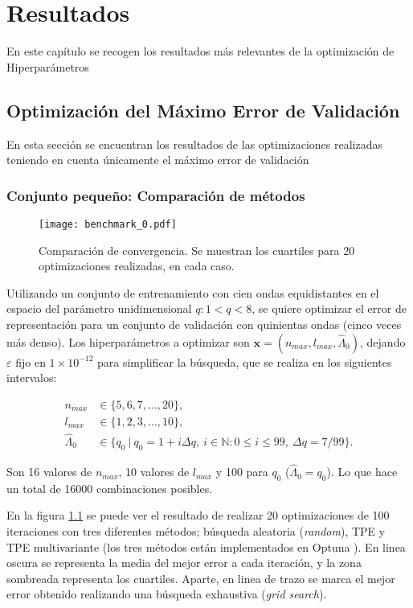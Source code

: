 \chapter{Resultados}

En este capítulo se recogen los resultados más relevantes de la optimización de Hiperparámetros
\section{Optimización del Máximo Error de Validación}
En esta sección se encuentran los resultados de las optimizaciones realizadas teniendo en cuenta únicamente el máximo error de validación
\subsection{Conjunto pequeño: Comparación de métodos}


\begin{figure}[h!]
\centering
\texttt{[image: benchmark\_0.pdf]}
\caption{Comparación de convergencia. Se muestran los cuartiles para 20 optimizaciones realizadas, en cada caso.}
\label{fig:bench0}
\end{figure}

Utilizando un conjunto de entrenamiento con cien ondas equidistantes en el espacio del parámetro unidimensional $q: 1 < q < 8$, se quiere optimizar el error de representación para un conjunto de validación con quinientas ondas (cinco veces más denso). Los hiperparámetros a optimizar son $\textbf{x} = (n_{max}, l_{max}, \hat{\Lambda}_0)$, dejando $\varepsilon$ fijo en $1\times 10^{-12}$ para simplificar la búsqueda, que se realiza en los siguientes intervalos:

\begin{align*}
n_{max} &\in \{5, 6, 7, ..., 20\},\\
l_{max} &\in \{1, 2, 3, ..., 10 \},\\
\hat{\Lambda}_0 &\in \{q_0 \ | \ q_0 = 1 + i \Delta q, \ i\in \mathbb{N} : 0 \le i \le 99, \ \Delta q = 7/99 \}.
\end{align*}

Son 16 valores de $n_{max}$, 10 valores de $l_{max}$ y 100 para $q_0$ ($\hat{\Lambda}_0 = q_0$). Lo que hace un total de 16000 combinaciones posibles.

En la figura \ref{fig:bench0} se puede ver el resultado de realizar 20 optimizaciones de 100 iteraciones con tres diferentes métodos; búsqueda aleatoria (\textit{random}), TPE y TPE multivariante (los tres métodos están implementados en Optuna \cite{optuna_2019}). En linea oscura se representa la media del mejor error a cada iteración, y la zona sombreada representa los cuartiles. Aparte, en linea de trazo se marca el mejor error obtenido realizando una búsqueda exhaustiva (\textit{grid search}).



